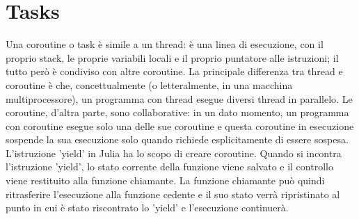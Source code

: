 \documentclass[a4paper]{extreport}
\begin{document}
\section*{Tasks}
Una coroutine o task è simile a un thread: è una linea di esecuzione, con il proprio stack, le proprie variabili locali e il proprio
puntatore alle istruzioni; il tutto però è condiviso con altre coroutine. La principale differenza tra thread e coroutine è che,
concettualmente (o letteralmente, in una macchina multiprocessore), un programma con thread esegue diversi thread in parallelo. 
Le coroutine, d'altra parte, sono collaborative: in un dato momento, un programma con coroutine esegue solo una delle sue coroutine
e questa coroutine in esecuzione sospende la sua esecuzione solo quando richiede esplicitamente di essere sospesa.~\cite{tasks}\\
L'istruzione 'yield' in Julia ha lo scopo di creare coroutine. Quando si incontra l'istruzione 'yield', lo stato corrente della
funzione viene salvato e il controllo viene restituito alla funzione chiamante.
La funzione chiamante può quindi ritrasferire l'esecuzione alla funzione cedente e il suo stato verrà ripristinato al punto in cui
è stato riscontrato lo 'yield' e l'esecuzione continuerà.

\end{document}

